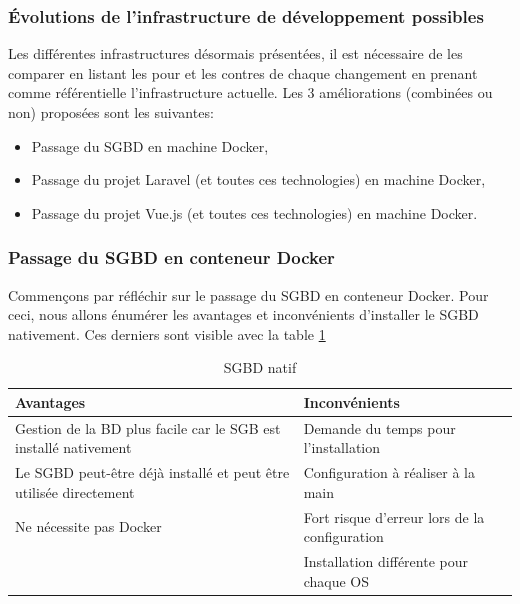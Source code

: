 \documentclass[
    iai, %
    il, %
]{heig-tb}
\begin{document}
\subsubsection{Évolutions de l'infrastructure de développement possibles}
Les différentes infrastructures désormais présentées, il est nécessaire de les comparer en listant les pour et les contres de chaque changement en prenant comme référentielle l'infrastructure actuelle.\newline
Les 3 améliorations (combinées ou non) proposées sont les suivantes:
\begin{itemize}
    \item Passage du SGBD en machine Docker,
    \item Passage du projet Laravel (et toutes ces technologies) en machine Docker,
    \item Passage du projet Vue.js (et toutes ces technologies) en machine Docker.
\end{itemize}

\subsubsection{Passage du SGBD en conteneur Docker}
Commençons par réfléchir sur le passage du SGBD en conteneur Docker.
Pour ceci, nous allons énumérer les avantages et inconvénients d'installer le SGBD nativement.
Ces derniers sont visible avec la table \ref{dev-sgbd-native}

\begin{table}[h]
    \begin{center}
        \caption{SGBD natif \label{dev-sgbd-native}}
        \begin{tabularx}{1.0\textwidth} {X|X}
            Avantages                                                         & Inconvénients                                 \\ \hline
            Gestion de la BD plus facile car le SGB est installé nativement   & Demande du temps pour l'installation          \\
            Le SGBD peut-être déjà installé et peut être utilisée directement & Configuration à réaliser à la main            \\
            Ne nécessite pas Docker                                           & Fort risque d'erreur lors de la configuration \\             & Installation différente pour chaque OS                                \\
        \end{tabularx}
    \end{center}
\end{table}
\end{document}
